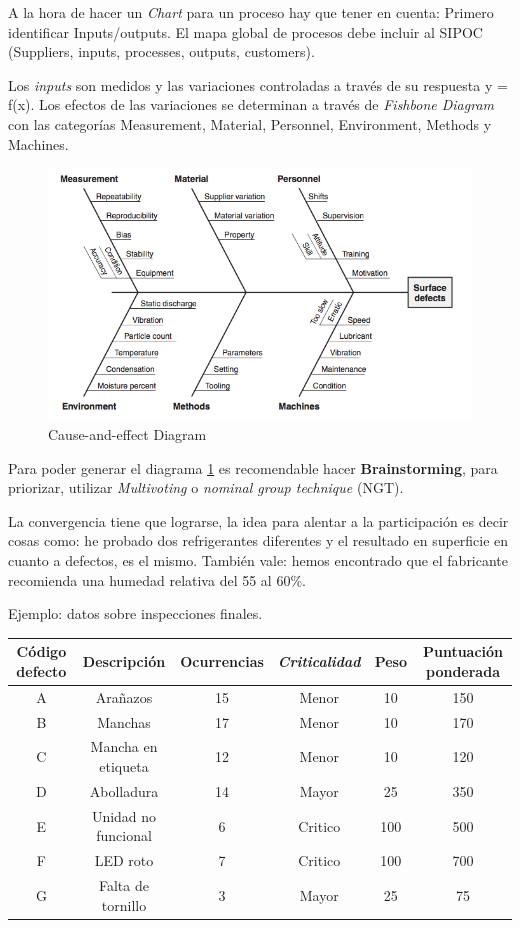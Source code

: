 \documentclass[]{article}
\begin{document}
A la hora de hacer un \textit{Chart} para un proceso hay que tener en cuenta: Primero identificar Inputs/outputs. El mapa global de procesos debe incluir al SIPOC (Suppliers, inputs, processes, outputs, customers). 

Los \textit{inputs} son medidos y las variaciones controladas a través de su respuesta y = f(x). Los efectos de las variaciones se determinan a través de \textit{Fishbone Diagram} con las categorías Measurement, Material, Personnel, Environment, Methods y Machines.

\begin{figure}[ht!]
	\centering
	\includegraphics[width=120mm]{imagenes/Cause-and-effectDiagram.png}
	\caption{Cause-and-effect Diagram}
	\label{fig:CauseandeffectDiagram}
\end{figure}

Para poder generar el diagrama \ref{fig:CauseandeffectDiagram} es recomendable hacer \textbf{Brainstorming}, para priorizar, utilizar \textit{Multivoting} o \textit{nominal group technique} (NGT).

La convergencia tiene que lograrse, la idea para alentar a la participación es decir cosas como: he probado dos refrigerantes diferentes y el resultado en superficie en cuanto a defectos, es el mismo. También vale: hemos encontrado que el fabricante recomienda una humedad relativa del 55 al 60\%. 


{\large Ejemplo: datos sobre inspecciones finales.}

\begin{tabular}{|c|c|c|c|c|c|}
	\hline Código defecto & Descripción & Ocurrencias & \textit{Criticalidad} & Peso & Puntuación ponderada \\ 
	\hline A & Arañazos & 15 & Menor & 10 & 150 \\ 
	\hline B & Manchas & 17 & Menor & 10 & 170 \\ 
	\hline C & Mancha en etiqueta & 12 & Menor & 10 & 120 \\ 
	\hline D & Abolladura & 14 & Mayor & 25 & 350 \\ 
	\hline E & Unidad no funcional & 6 & Critico & 100 & 500 \\ 
	\hline F & LED roto & 7 & Critico & 100 & 700\\ 
	\hline G & Falta de tornillo & 3 & Mayor & 25 & 75 \\ 
	\hline 
\end{tabular} 
\end{document}
